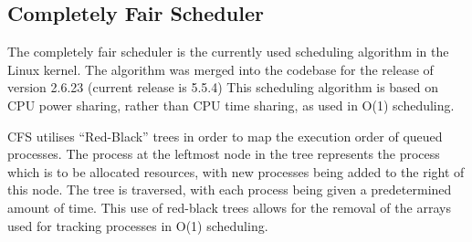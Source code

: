 \subsection{Completely Fair Scheduler}

The completely fair scheduler is the currently used scheduling algorithm in the
Linux kernel. The algorithm was merged into the codebase for the release of
version 2.6.23 (current release is 5.5.4) This scheduling algorithm is based on
CPU power sharing, rather than CPU time sharing, as used in O(1) scheduling.

CFS utilises ``Red-Black'' trees in order to map the execution order of queued
processes. The process at the leftmost node in the tree represents the process
which is to be allocated resources, with new processes being added to the right
of this node. The tree is traversed, with each process being given a
predetermined amount of time. This use of red-black trees allows for the removal
of the arrays used for tracking processes in O(1)
scheduling\cite{linuxKernelArchives}.
